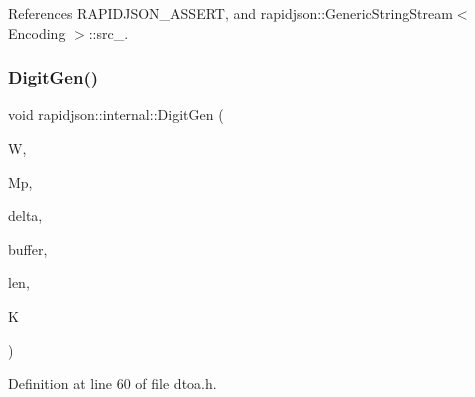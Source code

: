 References R\+A\+P\+I\+D\+J\+S\+O\+N\+\_\+\+A\+S\+S\+E\+RT, and rapidjson\+::\+Generic\+String\+Stream$<$ Encoding $>$\+::src\+\_\+.

\mbox{\label{namespacerapidjson_1_1internal_a6ba68d7defea7ccc4f8aa2feeafeccde}} 
\subsubsection{\texorpdfstring{DigitGen()}{DigitGen()}}
{\footnotesize\ttfamily void rapidjson\+::internal\+::\+Digit\+Gen (\begin{DoxyParamCaption}\item[{const \mbox{\hyperlink{structrapidjson_1_1internal_1_1_diy_fp}{Diy\+Fp}} \&}]{W,  }\item[{const \mbox{\hyperlink{structrapidjson_1_1internal_1_1_diy_fp}{Diy\+Fp}} \&}]{Mp,  }\item[{\mbox{\hyperlink{stdint_8h_aec6fcb673ff035718c238c8c9d544c47}{uint64\+\_\+t}}}]{delta,  }\item[{char $\ast$}]{buffer,  }\item[{int $\ast$}]{len,  }\item[{int $\ast$}]{K }\end{DoxyParamCaption})}



Definition at line 60 of file dtoa.\+h.


